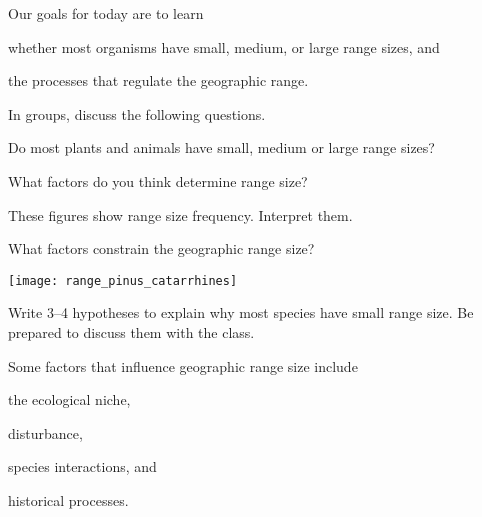 \documentclass[t]{beamer}
\begin{document}

\begin{frame}[t,plain]{Our goals for today are to learn}

	\hangpara whether most organisms have small, medium, or large range sizes, and
	
	\hangpara the processes that regulate the geographic range.

\end{frame}

\begin{frame}[t,plain]{In groups, discuss the following questions.}

	\hangpara Do most plants and animals have small, medium or large range sizes?

	\hangpara What factors do you think determine range size?

\end{frame}

{
\begin{frame}[t,plain]{These figures show range size frequency. Interpret them.}

\end{frame}
}

\begin{frame}[t,plain]{What factors constrain the geographic range size?}

	\vspace{\baselineskip}
	
	\begin{center}
		\texttt{[image: range\_pinus\_catarrhines]}
	\end{center}
	
	\hangpara Write 3–4 hypotheses to explain why most species have small range size. Be prepared to discuss them with the class.
	
\end{frame}


\begin{frame}[t,plain]{Some factors that influence geographic range size include}

	\hangpara the ecological niche,
	
	\hangpara disturbance, 
	
	\hangpara species interactions, and

	\hangpara historical processes.
	
		
\end{frame}
\end{document}
